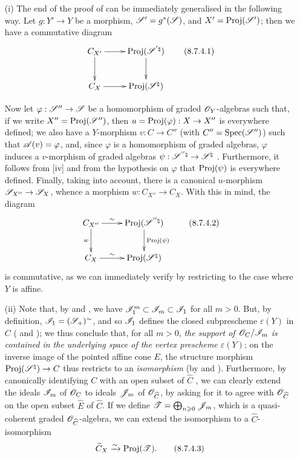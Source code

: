 \begin{remark}[8.7.4]
\label{II.8.7.4}
\begin{enumerate}
  \item[\rm{(i)}] The end of the proof of  can be immediately generalised in the following way.
    Let $g:Y'\to Y$ be a morphism, $\mathscr{S}'=g^*(\mathscr{S})$, and $X'=\operatorname{Proj}(\mathscr{S}')$;
    then we have a commutative diagram
    \[
    \label{II.8.7.4.1}
      \xymatrix{
        C_{X'}
          \ar[r]
          \ar[d]
      & \Proj(\sh{S}^{'\natural})
          \ar[d]
      \\C_X
          \ar[r]
      & \Proj(\sh{S}^\natural)
      }
    \tag{8.7.4.1}
    \]

    Now let $\varphi:\sh{S}''\to\sh{S}$ be a homomorphism of graded $\mathscr{O}_Y$-algebras such that, if we write $X''=\operatorname{Proj}(\mathscr{S}'')$, then $u=\Proj(\varphi):X\to X''$ is everywhere defined;
    we also have
    a $Y$-morphism $v:C\to C''$ (with $C''=\operatorname{Spec}(\mathscr{S}'')$) such that $\mathscr{A}(v)=\varphi$, and, since $\varphi$ is a homomorphism of graded algebras, $\varphi$ induces a $v$-morphism of graded algebras $\psi:\sh{S}^{''\natural}\to\sh{S}^\natural$ .
    Furthermore, it follows from [iv] and from the hypothesis on $\varphi$ that $\operatorname{Proj}(\psi)$ is everywhere defined.
    Finally, taking  into account, there is a canonical $u$-morphism $\sh{S}_{X''}\to\sh{S}_X$, whence  a morphism $w:C_{X''}\to C_X$.
    With this in mind, the diagram
    \[
    \label{II.8.7.4.2}
      \xymatrix{
        C_{X''}
          \ar[r]^-{\sim}
          \ar[d]_{w}
      & \Proj(\sh{S}^{''\natural})
          \ar[d]^{\Proj(\psi)}
      \\C_X
          \ar[r]^-{\sim}
      & \Proj(\sh{S}^\natural)
      }
    \tag{8.7.4.2}
    \]
    is commutative, as we can immediately verify by restricting to the case where $Y$ is affine.
  \item[\rm{(ii)}] Note that, by  and , we have $\mathscr{I}_1^m\subset\mathscr{I}_m\subset\mathscr{I}_1$ for all $m>0$.
    But, by definition, $\mathscr{I}_1=(\mathscr{S}_+)^\sim$, and so $\mathscr{I}_1$ defines the closed subprescheme $\varepsilon(Y)$ in $C$ ( and );
    we thus conclude that, for all $m>0$, \emph{the support of $\mathscr{O}_C/\mathscr{I}_m$ is contained in the underlying space of the vertex prescheme $\varepsilon(Y)$};
    on the inverse image of the pointed affine cone $E$, the structure morphism $\Proj(\sh{S}^\natural)\to C$ thus restricts to an \emph{isomorphism} (by  and ).
    Furthermore, by canonically identifying $C$ with an open subset of $\widehat{C}$ , we can clearly extend the ideals $\mathscr{I}_m$ of $\mathscr{O}_C$ to ideals $\mathscr{J}_m$ of $\mathscr{O}_{\widehat{C}}$, by asking for it to agree with $\mathscr{O}_{\widehat{C}}$ on the open subset $\widehat{E}$ of $\widehat{C}$.
    If we define $\mathscr{T}=\bigoplus_{n\geqslant0}\mathscr{J}_m$, which is a quasi-coherent graded $\mathscr{O}_{\widehat{C}}$-algebra, we can extend the isomorphism  to a $\widehat{C}$-isomorphism
    \[
    \label{II.8.7.4.3}
      \widehat{C}_X \xrightarrow{\sim} \operatorname{Proj}(\mathscr{T}).
    \tag{8.7.4.3}
    \]


\end{enumerate}
\end{remark}

